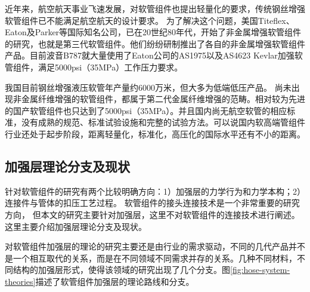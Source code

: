 近年来，航空航天事业飞速发展，对软管组件也提出轻量化的要求，传统钢丝增强软管组件已不能满足航空航天的设计要求。
为了解决这个问题，美国Titeflex、Eaton及Parker等国际知名公司，已在20世纪80年代，开始了非金属增强软管组件的研究，也就是第三代软管组件。他们纷纷研制推出了各自的非金属增强软管组件产品。目前波音B787就大量使用了Eaton公司的AS1975以及AS4623 Kevlar加强软管组件，满足5000psi（35MPa）工作压力要求。

\begin{figure}[!htbp]
	\centering
	\hspace{0.5cm}
	\label{fig:kevlarhose}
\end{figure}


我国目前钢丝增强液压软管年产量约6000万米\cite{xuhaitao2013}，但大多为低端低压产品。
尚未出现非金属纤维增强的软管组件，都属于第二代金属纤维增强的范畴。相对较为先进的国产软管组件也只达到了5000psi（35MPa）。并且国内尚无航空软管的相应标准，没有成熟的规范、标准试验设施和完整的试验方法。可以说国内软高端管组件行业还处于起步阶段，距离轻量化，标准化，高压化的国际水平还有不小的距离。



\subsection{加强层理论分支及现状}
针对软管组件的研究有两个比较明确方向：1）加强层的力学行为和力学本构；2）连接件与管体的扣压工艺过程。
软管组件的接头连接技术是一个非常重要的研究方向，
但本文的研究主要针对加强层，这里不对软管组件的连接技术进行阐述。这里主要介绍加强层理论分支及现状。


对软管组件加强层的理论的研究主要还是由行业的需求驱动，不同的几代产品并不是一个相互取代的关系，而是在不同领域不同需求并存的关系。几种不同材料，不同结构的加强层形式，使得该领域的研究出现了几个分支。图\ref{fig:hose-system-theories}描述了软管组件加强层的理论路线和分支。



